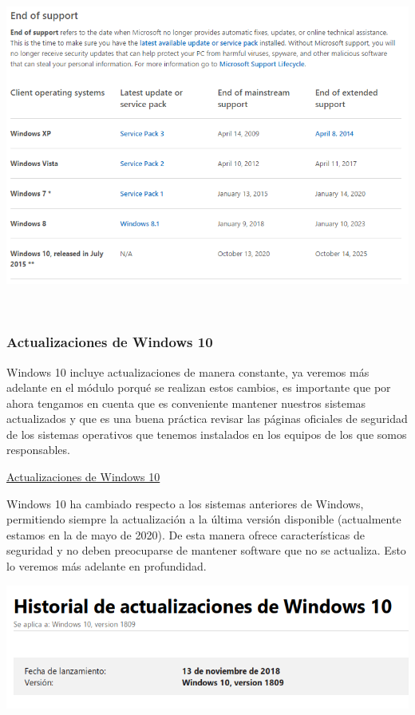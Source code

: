 \documentclass[11pt]{article}
\begin{document}
\begin{center}
\includegraphics[width=.9\linewidth]{Versiones/fin-soporte-windows.png}
\end{center}  

\subsubsection{Actualizaciones de Windows 10}
\label{sec:org63e1d15}
Windows 10 incluye actualizaciones de manera constante, ya veremos más
adelante en el módulo porqué se realizan estos cambios, es importante
que por ahora tengamos en cuenta que es conveniente mantener nuestros
sistemas actualizados y que es una buena práctica revisar las páginas
oficiales de seguridad de los sistemas operativos que tenemos instalados
en los equipos de los que somos responsables.

\href{https://support.microsoft.com/es-es/help/4464619/windows-10-update-history}{Actualizaciones
de Windows 10}

Windows 10 ha cambiado respecto a los sistemas anteriores de Windows,
permitiendo siempre la actualización a la última versión disponible
(actualmente estamos en la de mayo de 2020). De esta manera ofrece características
de seguridad y no deben preocuparse de mantener software que no se
actualiza. Esto lo veremos más adelante en profundidad.

\begin{center}
\includegraphics[width=.9\linewidth]{Versiones/windows10-1809.png}
\end{center}  
\end{document}
